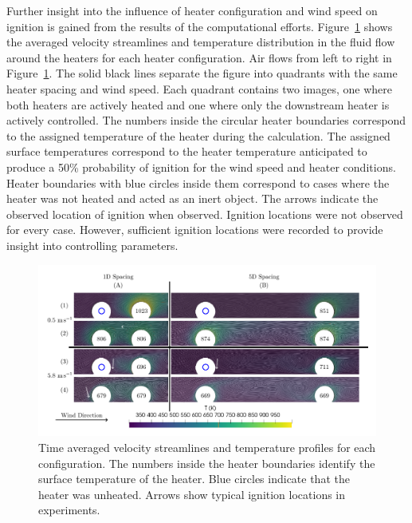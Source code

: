     Further insight into the influence of heater configuration and wind speed on ignition is gained from the results of the computational efforts. Figure~\ref{fig:multiHeaterCFD} shows the averaged velocity streamlines and temperature distribution in the fluid flow around the heaters for each heater configuration. Air flows from left to right in Figure~\ref{fig:multiHeaterCFD}. The solid black lines separate the figure into quadrants with the same heater spacing and wind speed. Each quadrant contains two images, one where both heaters are actively heated and one where only the downstream heater is actively controlled. The numbers inside the circular heater boundaries correspond to the assigned temperature of the heater during the calculation. The assigned surface temperatures correspond to the heater temperature anticipated to produce a 50\% probability of ignition for the wind speed and heater conditions. Heater boundaries with blue circles inside them correspond to cases where the heater was not heated and acted as an inert object. The arrows indicate the observed location of ignition when observed. Ignition locations were not observed for every case. However, sufficient ignition locations were recorded to provide insight into controlling parameters.
        \begin{figure}
            \centering
            \includegraphics[width=\columnwidth]{Figures/multiHeaterCFDstreamlines.pdf}
            \caption{Time averaged velocity streamlines and temperature profiles for each configuration. The numbers inside the heater boundaries identify the surface temperature of the heater. Blue circles indicate that the heater was unheated. Arrows show typical ignition locations in experiments.}
            \label{fig:multiHeaterCFD}
        \end{figure}
    \par
